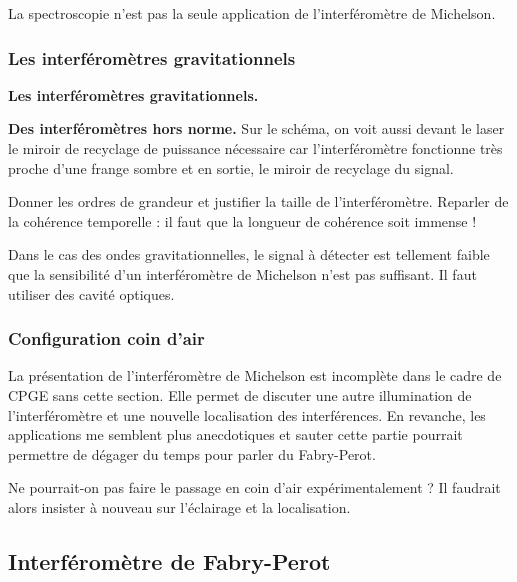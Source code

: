 \begin{transition}
La spectroscopie n'est pas la seule application de l'interféromètre de Michelson.
\end{transition}

\subsubsection{Les interféromètres gravitationnels}

\begin{slide}
\textbf{Les interféromètres gravitationnels.}
\end{slide}

\begin{slide}
\textbf{Des interféromètres hors norme.}
Sur le schéma, on voit aussi devant le laser le miroir de recyclage de puissance nécessaire car l'interféromètre fonctionne très proche d'une frange sombre et en sortie, le miroir de recyclage du signal.
\end{slide}

Donner les ordres de grandeur et justifier la taille de l'interféromètre.
Reparler de la cohérence temporelle : il faut que la longueur de cohérence soit immense !

\begin{transition}
Dans le cas des ondes gravitationnelles, le signal à détecter est tellement faible que la sensibilité d'un interféromètre de Michelson n'est pas suffisant.
Il faut utiliser des cavité optiques.
\end{transition}

\subsubsection{Configuration coin d'air}

\begin{remarque}
La présentation de l'interféromètre de Michelson est incomplète dans le cadre de CPGE sans cette section.
Elle permet de discuter une autre illumination de l'interféromètre et une nouvelle localisation des interférences.
En revanche, les applications me semblent plus anecdotiques et sauter cette partie pourrait permettre de dégager du temps pour parler du Fabry-Perot.

\noindent
Ne pourrait-on pas faire le passage en coin d'air expérimentalement ?
Il faudrait alors insister à nouveau sur l'éclairage et la localisation.
\end{remarque}

\subsection{Interféromètre de Fabry-Perot}

